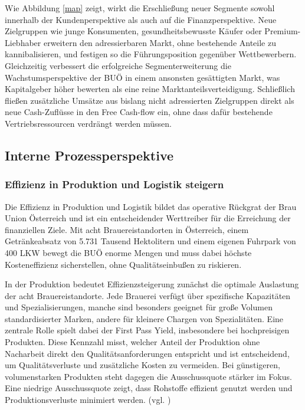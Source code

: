Wie Abbildung \ref{map} zeigt, wirkt die Erschließung neuer Segmente sowohl innerhalb der Kundenperspektive als auch auf die Finanzperspektive. Neue Zielgruppen wie junge Konsumenten, gesundheitsbewusste Käufer oder Premium-Liebhaber erweitern den adressierbaren Markt, ohne bestehende Anteile zu kannibalisieren, und festigen so die Führungsposition gegenüber Wettbewerbern. Gleichzeitig verbessert die erfolgreiche Segmenterweiterung die Wachstumsperspektive der BUÖ in einem ansonsten gesättigten Markt, was Kapitalgeber höher bewerten als eine reine Marktanteilsverteidigung. Schließlich fließen zusätzliche Umsätze aus bislang nicht adressierten Zielgruppen direkt als neue Cash-Zuflüsse in den Free Cash-flow ein, ohne dass dafür bestehende Vertriebsressourcen verdrängt werden müssen.

\subsection{Interne Prozessperspektive}  

\subsubsection{Effizienz in Produktion und Logistik steigern}  

Die Effizienz in Produktion und Logistik bildet das operative Rückgrat der Brau Union Österreich und ist ein entscheidender Werttreiber für die Erreichung der finanziellen Ziele. Mit acht Brauereistandorten in Österreich, einem Getränkeabsatz von 5.731 Tausend Hektolitern und einem eigenen Fuhrpark von 400 LKW bewegt die BUÖ enorme Mengen und muss dabei höchste Kosteneffizienz sicherstellen, ohne Qualitätseinbußen zu riskieren.  

In der Produktion bedeutet Effizienzsteigerung zunächst die optimale Auslastung der acht Brauereistandorte. Jede Brauerei verfügt über spezifische Kapazitäten und Spezialisierungen, manche sind besonders geeignet für große Volumen standardisierter Marken, andere für kleinere Chargen von Spezialitäten. Eine zentrale Rolle spielt dabei der First Pass Yield, insbesondere bei hochpreisigen Produkten. Diese Kennzahl misst, welcher Anteil der Produktion ohne Nacharbeit direkt den Qualitätsanforderungen entspricht und ist entscheidend, um Qualitätsverluste und zusätzliche Kosten zu vermeiden. Bei günstigeren, volumenstarken Produkten steht dagegen die Ausschussquote stärker im Fokus. Eine niedrige Ausschussquote zeigt, dass Rohstoffe effizient genutzt werden und Produktionsverluste minimiert werden. (vgl. \cite{FTY}) 

